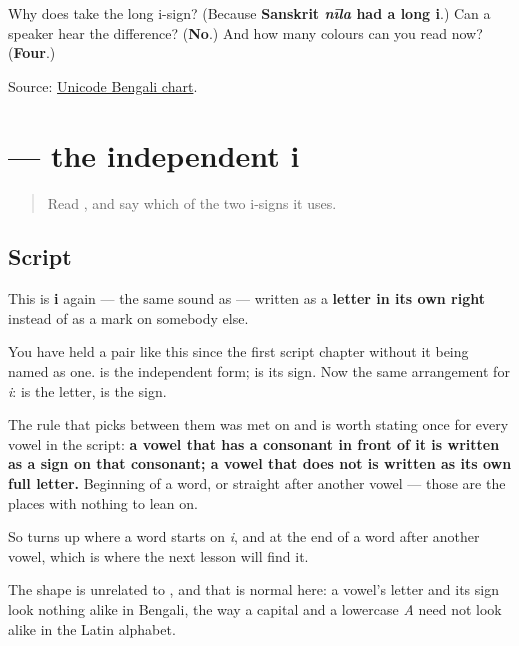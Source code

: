 \begin{tcolorbox}[breakable,colback=teal!4,colframe=teal!35!black,title={Before you move on}]
Why does \textbf{} take the long i-sign? (Because \textbf{Sanskrit \emph{nīla} had a long i}.) Can a speaker hear the difference? (\textbf{No}.) And how many colours can you read now? (\textbf{Four}.)

Source: \href{https://www.unicode.org/charts/PDF/U0980.pdf}{Unicode Bengali chart}.
\end{tcolorbox}
\section[i]{ — the independent i}

\label{lesson:BN-W04-i-indep}



\begin{quote}
Read \textbf{}, and say which of the two i-signs it uses.
\end{quote}

\subsection*{Script}
\begin{quote}
\end{quote}

This is \textbf{i} again — the same sound as \textbf{} — written as a \textbf{letter in its own right} instead of as a mark on somebody else.

You have held a pair like this since the first script chapter without it being named as one. \textbf{} is the independent form; \textbf{} is its sign. Now the same arrangement for \emph{i}: \textbf{} is the letter, \textbf{} is the sign.

The rule that picks between them was met on \textbf{} and is worth stating once for every vowel in the script: \textbf{a vowel that has a consonant in front of it is written as a sign on that consonant; a vowel that does not is written as its own full letter.} Beginning of a word, or straight after another vowel — those are the places with nothing to lean on.

So \textbf{} turns up where a word starts on \emph{i}, and at the end of a word after another vowel, which is where the next lesson will find it.

The shape is unrelated to \textbf{}, and that is normal here: a vowel's letter and its sign look nothing alike in Bengali, the way a capital and a lowercase \emph{A} need not look alike in the Latin alphabet.

